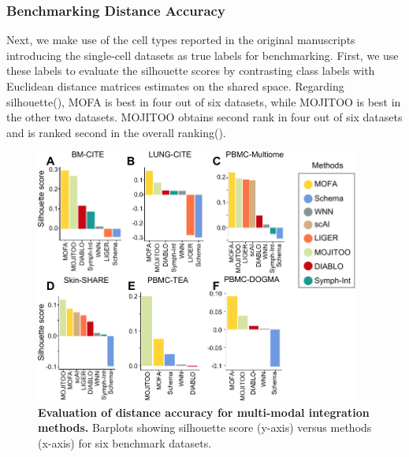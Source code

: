 \subsubsection{Benchmarking Distance Accuracy}
Next, we make use of the cell types reported in the original manuscripts introducing the single-cell datasets as true labels for benchmarking. First, we use these labels to evaluate the silhouette scores by contrasting class labels with Euclidean distance matrices estimates on the shared space. Regarding silhouette(), MOFA is best in four out of six datasets, while MOJITOO is best in the other two datasets. MOJITOO obtains second rank in four out of six datasets and is ranked second in the overall ranking(). 
\begin{figure}[!ht]
	\centering
	\includegraphics[width=0.95\textwidth]{silouette/fig}
	\vspace{0.1cm}
	\caption[Evaluation of distance accuracy for multi-modal integration methods.]{
        \textbf{Evaluation of distance accuracy for multi-modal integration methods.} Barplots showing silhouette score (y-axis) versus methods (x-axis) for six benchmark datasets. }
	\label{fig:silouette}
\end{figure}


